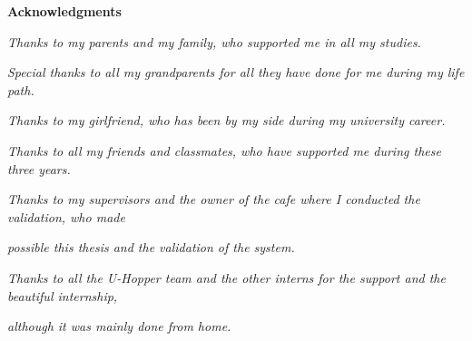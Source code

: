 \thispagestyle{empty}

\begin{center}
  {\bf \Huge Acknowledgments}
\end{center}

\vspace{4cm}

\emph{ Thanks to my parents and my family, who supported me in all my studies. }

\emph{ Special thanks to all my grandparents for all they have done for me during my life path. }

\emph{ Thanks to my girlfriend, who has been by my side during my university career. }

\emph{ Thanks to all my friends and classmates, who have supported me during these three years. }

\emph{ Thanks to my supervisors and the owner of the cafe where I conducted the validation, who made }

\emph{ possible this thesis and the validation of the system. }

\emph{ Thanks to all the U-Hopper team and the other interns for the support and the beautiful internship, }

\emph{ although it was mainly done from home. }
